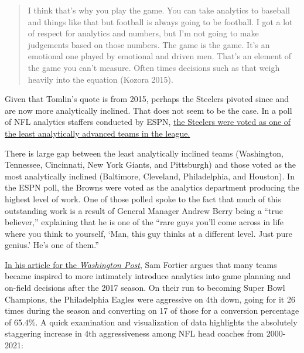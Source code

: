 \documentclass[
  letterpaper,
]{krantz}
\begin{document}
\begin{quote}
I think that's why you play the game. You can take analytics to baseball
and things like that but football is always going to be football. I got
a lot of respect for analytics and numbers, but I'm not going to make
judgements based on those numbers. The game is the game. It's an
emotional one played by emotional and driven men. That's an element of
the game you can't measure. Often times decisions such as that weigh
heavily into the equation (Kozora 2015).
\end{quote}

Given that Tomlin's quote is from 2015, perhaps the Steelers pivoted
since and are now more analytically inclined. That does not seem to be
the case. In a poll of NFL analytics staffers conducted by ESPN,
\href{https://www.espn.com/nfl/story/_/id/29939438/2020-nfl-analytics-survey-which-teams-most-least-analytically-inclined\#least}{the
Steelers were voted as one of the least analytically advanced teams in
the league.}

There is large gap between the least analytically inclined teams
(Washington, Tennessee, Cincinnati, New York Giants, and Pittsburgh) and
those voted as the most analytically inclined (Baltimore, Cleveland,
Philadelphia, and Houston). In the ESPN poll, the Browns were voted as
the analytics department producing the highest level of work. One of
those polled spoke to the fact that much of this outstanding work is a
result of General Manager Andrew Berry being a ``true believer,''
explaining that he is one of the ``rare guys you'll come across in life
where you think to yourself, `Man, this guy thinks at a different level.
Just pure genius.' He's one of them.''

\href{https://www.washingtonpost.com/sports/2020/01/16/nfls-analytics-movement-has-finally-reached-sports-mainstream/}{In
his article for the \emph{Washington Post}}, Sam Fortier argues that
many teams became inspired to more intimately introduce analytics into
game planning and on-field decisions after the 2017 season. On their run
to becoming Super Bowl Champions, the Philadelphia Eagles were
aggressive on 4th down, going for it 26 times during the season and
converting on 17 of those for a conversion percentage of 65.4\%. A quick
examination and visualization of data highlights the absolutely
staggering increase in 4th aggressiveness among NFL head coaches from
2000-2021:
\end{document}
